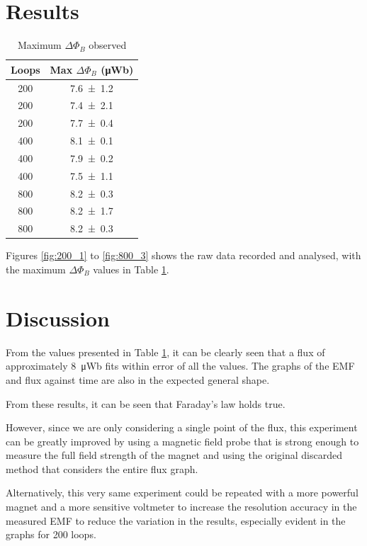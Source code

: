 \documentclass[a4paper]{scrartcl}
\begin{document}
\section{Results}
\begin{table}
    \centering
    \begin{tabular}{c | c}
        Loops & Max \(\Delta\Phi_B\) (\si{\micro\weber}) \\
        \hline
        200 & \SI{7.6 \pm 1.2}{} \\
        200 & \SI{7.4 \pm 2.1}{} \\
        200 & \SI{7.7 \pm 0.4}{} \\
        400 & \SI{8.1 \pm 0.1}{} \\
        400 & \SI{7.9 \pm 0.2}{} \\
        400 & \SI{7.5 \pm 1.1}{} \\
        800 & \SI{8.2 \pm 0.3}{} \\
        800 & \SI{8.2 \pm 1.7}{} \\
        800 & \SI{8.2 \pm 0.3}{} \\
        \hline
    \end{tabular}
    \caption{Maximum \(\Delta\Phi_B\) observed}
    \label{tab:max_phi}
\end{table}

Figures \ref{fig:200_1} to \ref{fig:800_3} shows the raw data recorded and analysed, with the maximum \(\Delta\Phi_B\) values in Table \ref{tab:max_phi}.

\section{Discussion}
From the values presented in Table \ref{tab:max_phi}, it can be clearly seen that a flux of approximately \SI{8}{\micro\weber} fits within error of all the values. The graphs of the EMF and flux against time are also in the expected general shape.

From these results, it can be seen that Faraday's law holds true.

However, since we are only considering a single point of the flux, this experiment can be greatly improved by using a magnetic field probe that is strong enough to measure the full field strength of the magnet and using the original discarded method that considers the entire flux graph.

Alternatively, this very same experiment could be repeated with a more powerful magnet and a more sensitive voltmeter to increase the resolution accuracy in the measured EMF to reduce the variation in the results, especially evident in the graphs for 200 loops.
\end{document}
